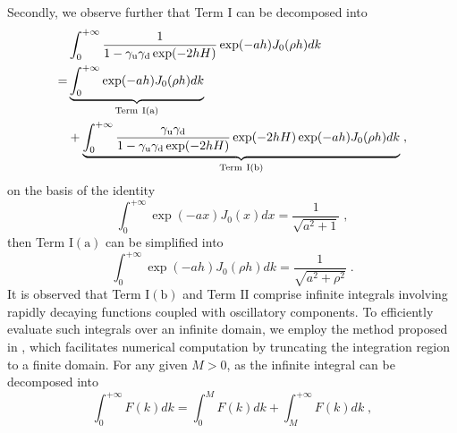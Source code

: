Secondly, we observe further that Term $\mathrm{I}$ can be decomposed into
\begin{align*}
&\int_0^{+\infty} \frac{1}{1-\gamma_{\mathrm{u}}\gamma_{\mathrm{d}}\exp(-2hH)}  \exp(-ah)  J_0(\rho h)d k\\
=&\underbrace{\int_0^{+\infty}   \exp(-ah)  J_0(\rho h)d k}_{\text{Term}~\mathrm{I(a)}}\\
&+\underbrace{\int_0^{+\infty} \frac{\gamma_{\mathrm{u}}\gamma_{\mathrm{d}}}{1-\gamma_{\mathrm{u}}\gamma_{\mathrm{d}}\exp(-2hH)}  \exp(-2hH)\exp(-ah)  J_0(\rho h)d k}_{\text{Term}~\mathrm{I(b)}}\;,
\end{align*}
on the basis of the identity
\begin{equation*}
    \int_0^{+\infty}\exp(-ax) J_0(x)d x=\frac{1}{\sqrt{a^2+1}}\;,
\end{equation*}
then Term $\mathrm{I(a)}$ can be simplified into 
\begin{equation}\label{eq...text...TermI(A)}
    \int_0^{+\infty}   \exp(-ah)  J_0(\rho h)d k=\frac{1}{\sqrt{a^2+\rho^2}}\;.
\end{equation}
It is observed that Term $\mathrm{I(b)}$ and Term $\mathrm{II}$  comprise infinite integrals involving rapidly decaying functions coupled with oscillatory components. To efficiently evaluate such integrals over an infinite domain, we employ the method proposed in \cite{trefethen2022exactness}, which facilitates numerical computation by truncating the integration region to a finite domain. 
For any given 
$M>0$, as the infinite integral can be decomposed into
\begin{equation*}
 \int_0^{+\infty} F(k)d  k=  \int_0^{M} F(k)d  k+\int_M^{+\infty} F(k)d  k\;,
\end{equation*} 
